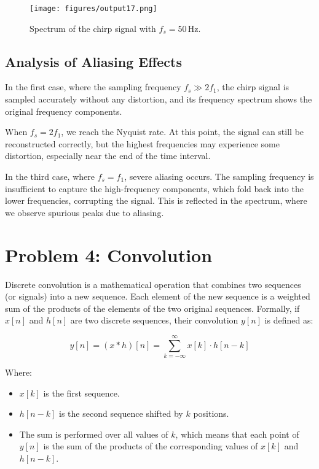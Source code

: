 \documentclass[10pt]{article}
\theoremstyle{definition}
\theoremstyle{remark}
\theoremstyle{definition}
\numberwithin{equation}{prob}
\begin{document}
\begin{figure}[H]
    \centering
    \texttt{[image: figures/output17.png]}  
    \caption{Spectrum of the chirp signal with \( f_s = 50 \, \text{Hz} \).}
\end{figure}

\subsection{Analysis of Aliasing Effects}
In the first case, where the sampling frequency \( f_s \gg 2f_1 \), the chirp signal is sampled accurately without any distortion, and its frequency spectrum shows the original frequency components.

When \( f_s = 2f_1 \), we reach the Nyquist rate. At this point, the signal can still be reconstructed correctly, but the highest frequencies may experience some distortion, especially near the end of the time interval.

In the third case, where \( f_s = f_1 \), severe aliasing occurs. The sampling frequency is insufficient to capture the high-frequency components, which fold back into the lower frequencies, corrupting the signal. This is reflected in the spectrum, where we observe spurious peaks due to aliasing.



\section{Problem 4: Convolution}

Discrete convolution is a mathematical operation that combines two sequences (or signals) into a new sequence. Each element of the new sequence is a weighted sum of the products of the elements of the two original sequences. Formally, if \(x[n]\) and \(h[n]\) are two discrete sequences, their convolution \(y[n]\) is defined as:

\[
y[n] = (x * h)[n] = \sum_{k=-\infty}^{\infty} x[k] \cdot h[n-k]
\]

Where:
\begin{itemize}
    \item \(x[k]\) is the first sequence.
    \item \(h[n-k]\) is the second sequence shifted by \(k\) positions.
    \item The sum is performed over all values of \(k\), which means that each point of \(y[n]\) is the sum of the products of the corresponding values of \(x[k]\) and \(h[n-k]\).
\end{itemize}
\end{document}
